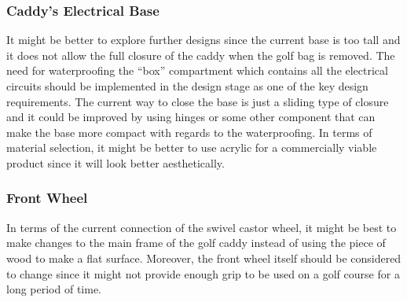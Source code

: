 \documentclass[11pt,landscape]{article}
\begin{document}
\begin{multicols}{2}
    \subsubsection{Caddy's Electrical Base}
    It might be better to explore further designs since the current base is too
    tall and it does not allow the full closure of the caddy when the golf bag
    is removed. The need for waterproofing the “box” compartment which contains
    all the electrical circuits should be implemented in the design stage as one
    of the key design requirements. The current way to close the base is just a
    sliding type of closure and it could be improved by using hinges or some
    other component that can make the base more compact with regards to the
    waterproofing. In terms of material selection, it might be better to use
    acrylic for a commercially viable product since it will look better
    aesthetically. 
    
    \subsubsection{Front Wheel}
    In terms of the current connection of the swivel castor wheel, it might be
    best to make changes to the main frame of the golf caddy instead of using
    the piece of wood to make a flat surface. Moreover, the front wheel itself
    should be considered to change since it might not provide enough grip to be
    used on a golf course for a long period of time.
    
\end{multicols}
\end{document}
